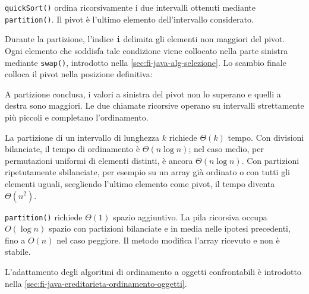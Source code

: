 \texttt{quickSort()} ordina ricorsivamente i due intervalli
ottenuti mediante \texttt{partition()}. Il pivot è l'ultimo
elemento dell'intervallo considerato.

\noindent
\begin{minipage}{\linewidth}

\end{minipage}

Durante la partizione, l'indice \texttt{i} delimita gli elementi
non maggiori del pivot. Ogni elemento che soddisfa tale condizione
viene collocato nella parte sinistra mediante \texttt{swap()},
introdotto nella \cref{sec:fi-java-alg-selezione}. Lo scambio
finale colloca il pivot nella posizione definitiva:

\noindent
\begin{minipage}{\linewidth}

\end{minipage}

A partizione conclusa, i valori a sinistra del pivot non lo
superano e quelli a destra sono maggiori. Le due chiamate
ricorsive operano su intervalli strettamente più piccoli e
completano l'ordinamento.

La partizione di un intervallo di lunghezza \(k\) richiede
\(\Theta(k)\) tempo. Con divisioni bilanciate, il tempo di
ordinamento è \(\Theta(n\log n)\); nel caso medio, per
permutazioni uniformi di elementi distinti, è ancora
\(\Theta(n\log n)\).
Con partizioni ripetutamente sbilanciate, per esempio su un
array già ordinato o con tutti gli elementi uguali, scegliendo
l'ultimo elemento come pivot, il tempo diventa \(\Theta(n^2)\).

\texttt{partition()} richiede \(\Theta(1)\) spazio aggiuntivo.
La pila ricorsiva occupa \(O(\log n)\) spazio con partizioni
bilanciate e in media nelle ipotesi precedenti, fino a
\(O(n)\) nel caso peggiore. Il metodo modifica l'array
ricevuto e non è stabile.

L'adattamento degli algoritmi di ordinamento a oggetti
confrontabili è introdotto nella
\cref{sec:fi-java-ereditarieta-ordinamento-oggetti}.
